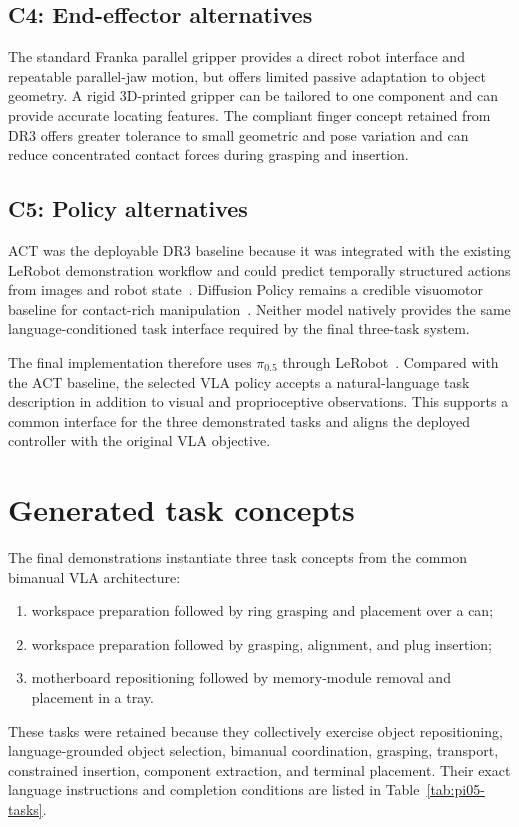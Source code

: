 \subsection*{C4: End-effector alternatives}

The standard Franka parallel gripper provides a direct robot interface and repeatable parallel-jaw motion, but offers limited passive adaptation to object geometry. A rigid 3D-printed gripper can be tailored to one component and can provide accurate locating features. The compliant finger concept retained from DR3 offers greater tolerance to small geometric and pose variation and can reduce concentrated contact forces during grasping and insertion. 

\subsection*{C5: Policy alternatives}

ACT was the deployable DR3 baseline because it was integrated with the existing LeRobot demonstration workflow and could predict temporally structured actions from images and robot state~\cite{act}. Diffusion Policy remains a credible visuomotor baseline for contact-rich manipulation~\cite{diffusionpolicy}. Neither model natively provides the same language-conditioned task interface required by the final three-task system.

The final implementation therefore uses $\pi_{0.5}$ through LeRobot~\cite{pi05,lerobotpi05}. Compared with the ACT baseline, the selected VLA policy accepts a natural-language task description in addition to visual and proprioceptive observations. This supports a common interface for the three demonstrated tasks and aligns the deployed controller with the original VLA objective.

\section*{Generated task concepts}

The final demonstrations instantiate three task concepts from the common bimanual VLA architecture:

\begin{enumerate}
  \item workspace preparation followed by ring grasping and placement over a can;
  \item workspace preparation followed by grasping, alignment, and plug insertion;
  \item motherboard repositioning followed by memory-module removal and placement in a tray.
\end{enumerate}

These tasks were retained because they collectively exercise object repositioning, language-grounded object selection, bimanual coordination, grasping, transport, constrained insertion, component extraction, and terminal placement. Their exact language instructions and completion conditions are listed in Table~\ref{tab:pi05-tasks}.

